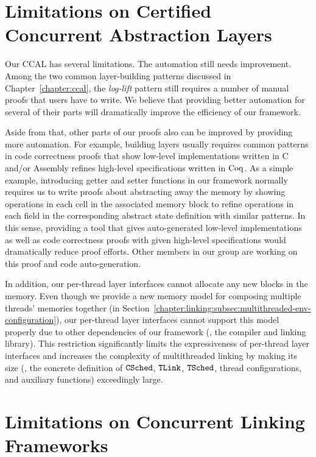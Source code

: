 \section{Limitations on Certified Concurrent  Abstraction Layers}

Our CCAL has several limitations.
The automation still needs improvement. Among the two common layer-building patterns discussed in 
Chapter~\ref{chapter:ccal},
the \textit{log-lift} pattern still requires a number of manual proofs that users have to write. 
We believe that providing better automation for several of their parts will dramatically improve the efficiency of our framework.

Aside from that, other parts of our proofs also can be improved by providing more automation. 
For example, building layers usually requires common patterns in code correctness proofs that show low-level implementations written in C and/or Assembly refines high-level specifications written in $\mathrm{Coq}$. 
As a simple example, introducing getter and setter functions in our framework normally requires us to write proofs about abstracting away the memory by showing operations in each cell in the associated memory block to refine operations in each field  in the corresponding abstract state definition with similar patterns.
In this sense, providing a tool that gives auto-generated low-level implementations as well as code correctness proofs with given high-level specifications would dramatically reduce proof efforts. 
Other members in our group are working on this proof and code auto-generation.

In addition, our per-thread layer interfaces cannot allocate any new blocks in the memory. Even though we provide a new memory 
model for composing multiple threads’ memories together 
(in  Section~\ref{chapter:linking:subsec:multithreaded-env-configuration}),
our per-thread layer interfaces cannot support this model properly due to other dependencies of our framework 
(\ie, the compiler and linking library). This restriction significantly limits the expressiveness of per-thread layer interfaces 
and increases the complexity of multithreaded linking by making its size  (\ie, the concrete definition of 
${{\mathrm{\texttt{CSched}}}}$, ${{\mathrm{\texttt{TLink}}}}$, ${{\mathrm{\texttt{TSched}}}}$,  thread configurations, and auxiliary functions) exceedingly large. 



\section{Limitations on Concurrent Linking Frameworks}


